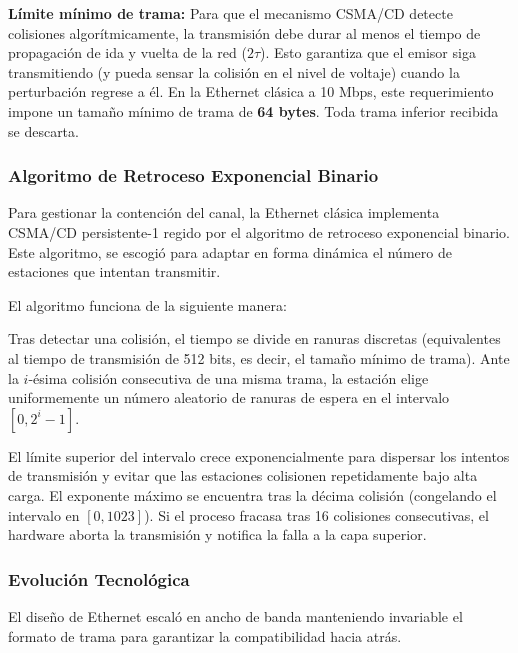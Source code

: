 \textbf{Límite mínimo de trama:} Para que el mecanismo CSMA/CD detecte colisiones algorítmicamente, la transmisión debe durar al menos el tiempo de propagación de ida y vuelta de la red ($2\tau$). Esto garantiza que el emisor siga transmitiendo (y pueda sensar la colisión en el nivel de voltaje) cuando la perturbación regrese a él. En la Ethernet clásica a 10 Mbps, este requerimiento impone un tamaño mínimo de trama de \textbf{64 bytes}. Toda trama inferior recibida se descarta.

\subsubsection{Algoritmo de Retroceso Exponencial Binario}

Para gestionar la contención del canal, la Ethernet clásica implementa CSMA/CD persistente-1 regido por el algoritmo de retroceso exponencial binario. Este algoritmo, se escogió para adaptar en forma dinámica el número de estaciones que intentan transmitir.

El algoritmo funciona de la siguiente manera:

Tras detectar una colisión, el tiempo se divide en ranuras discretas (equivalentes al tiempo de transmisión de 512 bits, es decir, el tamaño mínimo de trama). Ante la $i$-ésima colisión consecutiva de una misma trama, la estación elige uniformemente un número aleatorio de ranuras de espera en el intervalo $[0, 2^i - 1]$. 

El límite superior del intervalo crece exponencialmente para dispersar los intentos de transmisión y evitar que las estaciones colisionen repetidamente bajo alta carga. El exponente máximo se encuentra tras la décima colisión (congelando el intervalo en $[0, 1023]$). Si el proceso fracasa tras 16 colisiones consecutivas, el hardware aborta la transmisión y notifica la falla a la capa superior.

\subsubsection{Evolución Tecnológica}

El diseño de Ethernet escaló en ancho de banda manteniendo invariable el formato de trama para garantizar la compatibilidad hacia atrás.

